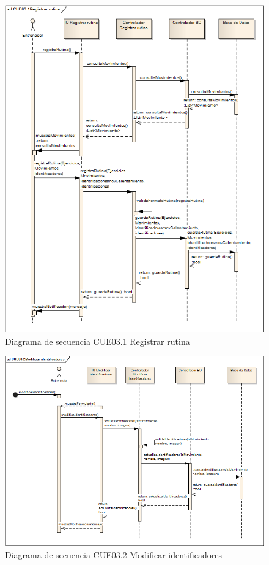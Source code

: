 \begin{figure}[H]
	\begin{center}
		\includegraphics[scale=0.6]{./Figuras/Secuencias/CUE03_1Registrar_rutina}
	\end{center}
	\caption{Diagrama de secuencia CUE03.1 Registrar rutina}
	\label{fig:SE_CUE031}
\end{figure}

\begin{figure}[H]
	\begin{center}
		\includegraphics[scale=0.6]{./Figuras/Secuencias/CUE03_2Modificar_identificadores}
	\end{center}
	\caption{Diagrama de secuencia CUE03.2 Modificar identificadores}
	\label{fig:SE_CUE032}
\end{figure}

